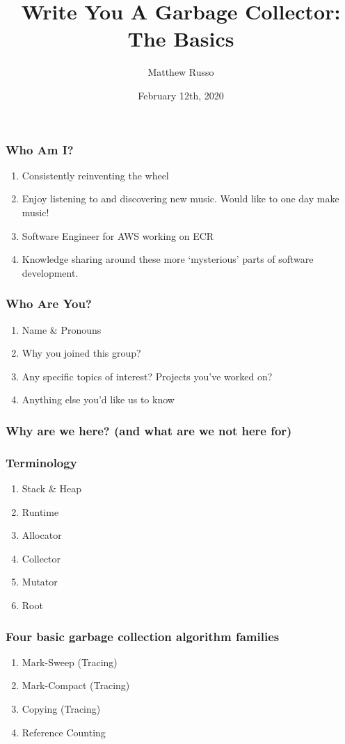 \documentclass{beamer}
\title{Write You A Garbage Collector: The Basics}
\author{Matthew Russo}
\institute{Reinventing the Wheel}
\date{February 12th, 2020}
\begin{document}
 
\frame{\titlepage}

\begin{frame}
  \frametitle{Who Am I?}
  \begin{enumerate}
    \item Consistently reinventing the wheel
    \item Enjoy listening to and discovering new music. Would like to one day make music!
    \item Software Engineer for AWS working on ECR
    \item Knowledge sharing around these more `mysterious' parts of software development.
  \end{enumerate}
\end{frame}

\begin{frame}
  \frametitle{Who Are You?}
  \begin{enumerate}
    \item Name & Pronouns
    \item Why you joined this group?
    \item Any specific topics of interest? Projects you've worked on?
    \item Anything else you'd like us to know
  \end{enumerate}
\end{frame}

\begin{frame}
  \frametitle{Why are we here? (and what are we not here for)}
\end{frame}

\begin{frame}
  \frametitle{Terminology}
  \begin{enumerate}
    \item Stack & Heap
    \item Runtime
    \item Allocator
    \item Collector
    \item Mutator
    \item Root
  \end{enumerate}
\end{frame}

\begin{frame}
  \frametitle{Four basic garbage collection algorithm families}
  \begin{enumerate}
    \item Mark-Sweep (Tracing)
    \item Mark-Compact (Tracing)
    \item Copying (Tracing)
    \item Reference Counting
  \end{enumerate}
\end{frame}
\end{document}
